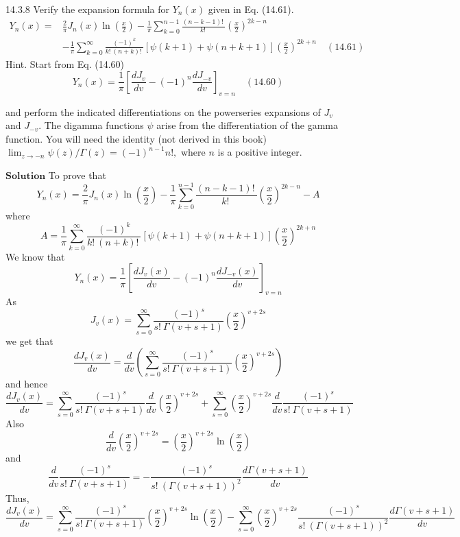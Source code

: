\begin{mybox}{14.3.8}
Verify the expansion formula for $Y_{n}(x)$ given in Eq. (14.61).
$$
\begin{aligned}
Y_{n}(x)=& \frac{2}{\pi} J_{n}(x) \ln \left(\frac{x}{2}\right)-\frac{1}{\pi} \sum_{k=0}^{n-1} \frac{(n-k-1) ! \ }{k ! \ }\left(\frac{x}{2}\right)^{2 k-n} \\
&-\frac{1}{\pi} \sum_{k=0}^{\infty} \frac{(-1)^{k}}{k ! \ (n+k) ! \ }[\psi(k+1)+\psi(n+k+1)]\left(\frac{x}{2}\right)^{2 k+n} \quad (14.61)
\end{aligned}
$$
Hint. Start from Eq. (14.60) 
$$
Y_{n}(x)=\frac{1}{\pi}\left[\frac{d J_{v}}{d v}-(-1)^{n} \frac{d J_{-v}}{d v}\right]_{v=n} \quad (14.60)
$$

and perform the indicated differentiations on the powerseries expansions of $J_{v}$ and $J_{-v}$. The digamma functions $\psi$ arise from the differentiation of the gamma function. You will need the identity (not derived in this book) $\lim _{z \rightarrow-n} \psi(z) / \Gamma(z)=(-1)^{n-1} n !,$ where $n$ is a positive integer.

\end{mybox}
$\boxed{\textbf{Solution}}$ To prove that 
$$Y_{n}(x)=\frac{2}{\pi} J_{n}(x) \ln \left(\frac{x}{2}\right)-\frac{1}{\pi} \sum_{k=0}^{n-1} \frac{(n-k-1) ! \ }{k ! \ }\left(\frac{x}{2}\right)^{2 k-n}-A$$ 
where
$$A=\frac{1}{\pi} \sum_{k=0}^{\infty} \frac{(-1)^{k}}{k ! \ (n+k) ! \ }[\psi(k+1)+\psi(n+k+1)]\left(\frac{x}{2}\right)^{2 k+n}$$
We know that 
$$Y_{n}(x)=\frac{1}{\pi}\left[\frac{d J_{v}(x)}{d v}-(-1)^{n} \frac{d J_{-v}(x)}{d v}\right]_{v=n}$$
As 
$$J_{v}(x)=\sum_{s=0}^{\infty} \frac{(-1)^{s}}{s ! \  \Gamma(v+s+1)}\left(\frac{x}{2}\right)^{v+2 s}$$ 
we get that 
$$\frac{d J_{v}(x)}{d v}=\frac{d}{d v}\left(\sum_{s=0}^{\infty} \frac{(-1)^{s}}{s ! \  \Gamma(v+s+1)}\left(\frac{x}{2}\right)^{v+2 s}\right)$$
and hence 
$$\frac{d J_{v}(x)}{d v}=\sum_{s=0}^{\infty} \frac{(-1)^{s}}{s ! \  \Gamma(v+s+1)} \frac{d}{d v}\left(\frac{x}{2}\right)^{v+2 s}+\sum_{s=0}^{\infty}\left(\frac{x}{2}\right)^{v+2 s} \frac{d}{d v} \frac{(-1)^{s}}{s ! \  \Gamma(v+s+1)}$$
Also 
$$\frac{d}{d v}\left(\frac{x}{2}\right)^{v+2 s}=\left(\frac{x}{2}\right)^{v+2 s} \ln \left(\frac{x}{2}\right)$$ 
and 
$$\frac{d}{d v} \frac{(-1)^{s}}{s ! \  \Gamma(v+s+1)}=-\frac{(-1)^{s}}{s ! \ (\Gamma(v+s+1))^{2}} \frac{d \Gamma(v+s+1)}{d v}$$
Thus, 
$$\frac{d J_{v}(x)}{d v}=\sum_{s=0}^{\infty} \frac{(-1)^{s}}{s ! \  \Gamma(v+s+1)}\left(\frac{x}{2}\right)^{v+2 s} \ln \left(\frac{x}{2}\right)-\sum_{s=0}^{\infty}\left(\frac{x}{2}\right)^{v+2 s} \frac{(-1)^{s}}{s ! \ (\Gamma(v+s+1))^{2}} \frac{d \Gamma(v+s+1)}{d v}$$
